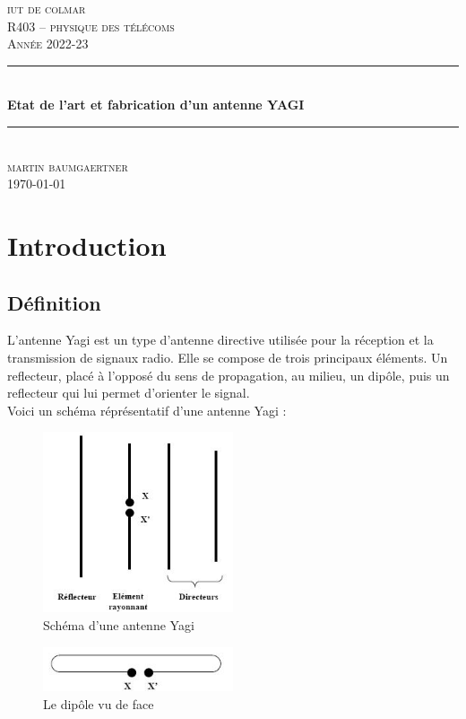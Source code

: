 \documentclass[12pt, a4paper]{article}
\begin{document}
\begin{titlepage}
	\newcommand{\HRule}{\rule{\linewidth}{0.5mm}} 
	\center 
	\textsc{\LARGE iut de colmar}\\[6.5cm] 
	\textsc{\Large R403 -- physique des télécoms}\\[0.5cm] 
	\textsc{\large Année 2022-23}\\[0.5cm]
	\HRule\\[0.75cm]
	{\Large\bfseries Etat de l'art et fabrication d'un antenne YAGI}\\[0.4cm]
	\HRule\\[1.5cm]
	\textsc{\large martin baumgaertner}\\[6cm] 

	\vfill\vfill\vfill
	{\large\today} 
	\vfill
\end{titlepage}
\newpage
\tableofcontents
\newpage
\section{Introduction}
\subsection{Définition}
L'antenne Yagi est un type d'antenne directive utilisée 
pour la réception et la transmission de signaux radio. 
Elle se compose de trois principaux éléments. Un reflecteur,
placé à l'opposé du sens de propagation, au milieu, 
un dipôle, puis un reflecteur qui lui permet d'orienter
le signal.\\

Voici un schéma réprésentatif d'une antenne Yagi :
\begin{figure}[h]
    \centering
    \includegraphics[width=0.5\textwidth]{img/yagi.jpg}
    \caption{Schéma d'une antenne Yagi \cite{r1}}
    \label{fig:yagi}
\end{figure}

\begin{figure}[h]
    \centering
    \includegraphics[width=0.5\textwidth]{img/trombone-yagi.jpg}
    \caption{Le dipôle vu de face \cite{r1}}
    \label{fig:yagi-de-face}
\end{figure}
\end{document}
